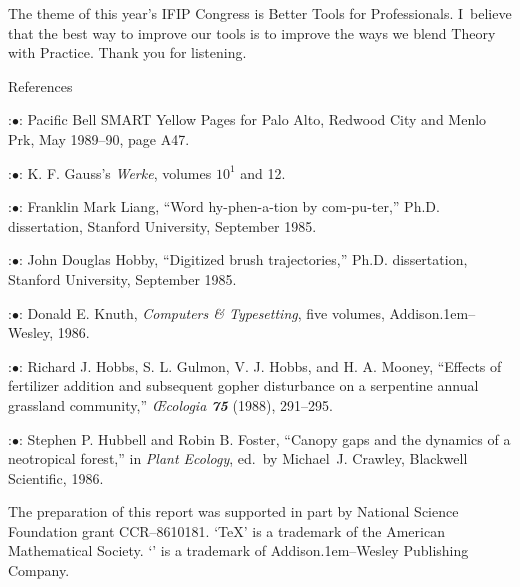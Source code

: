 The theme of this year's IFIP Congress is Better Tools for
Professionals. I~believe that the best way to improve our tools is to
improve the ways we blend Theory with Practice. Thank you for
listening.

\bigskip
\noindent
References

\bigskip
\display 30pt:$\bullet$:
Pacific Bell SMART Yellow Pages for Palo Alto, Redwood City and Menlo
Prk, May 1989--90, page A47.

\smallskip
\display 30pt:$\bullet$:
K. F. Gauss's {\sl Werke}, volumes $10^1$ and 12.

\smallskip
\display 30pt:$\bullet$:
Franklin Mark Liang, ``Word hy-phen-a-tion by com-pu-ter,'' Ph.D.
dissertation, Stanford University, September 1985.

\smallskip
\display 30pt:$\bullet$:
John Douglas Hobby, ``Digitized brush trajectories,'' Ph.D.
dissertation, Stanford University, September 1985.

\smallskip
\display 30pt:$\bullet$:
Donald E. Knuth, {\sl Computers \& Typesetting}, five volumes,
Addison\kern.1em--Wesley, 1986.

\smallskip
\display 30pt:$\bullet$:
Richard J. Hobbs, S. L. Gulmon, V. J. Hobbs, and H. A. Mooney,
``Effects of fertilizer addition and subsequent gopher disturbance on
a serpentine annual grassland community,'' {\sl{\OE}cologia\/ \bf 75}
(1988), 291--295.

\smallskip
\display 30pt:$\bullet$:
Stephen P. Hubbell and Robin B. Foster, ``Canopy gaps and the dynamics
of a neotropical forest,'' in {\sl Plant Ecology}, ed.\ by Michael~J.
Crawley, Blackwell Scientific, 1986.

\bigskip
\noindent
The preparation of this report was supported in part by National
Science Foundation grant CCR--8610181. `\TeX' is a trademark of the
American Mathematical Society. `\MF' is a trademark of
Addison\kern.1em--Wesley Publishing Company.



\bye
